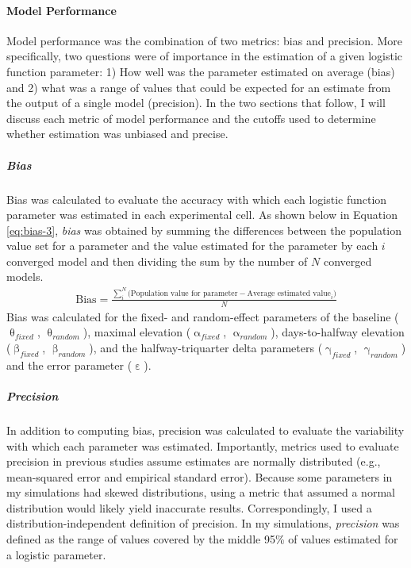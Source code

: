 \documentclass[
12pt, %
twoside,
english]{guelphthesis}
\begin{document}
\hypertarget{model-performance-2}{%
\paragraph{Model Performance}\label{model-performance-2}}

Model performance was the combination of two metrics: bias and precision. More specifically, two questions were of importance in the estimation of a given logistic function parameter: 1) How well was the parameter estimated on average (bias) and 2) what was a range of values that could be expected for an estimate from the output of a single model (precision). In the two sections that follow, I will discuss each metric of model performance and the cutoffs used to determine whether estimation was unbiased and precise.

\hypertarget{bias-1}{%
\subparagraph{Bias}\label{bias-1}}

Bias was calculated to evaluate the accuracy with which each logistic
function parameter was estimated in each experimental cell. As shown below in Equation
\eqref{eq:bias-3}, \emph{bias} was obtained by summing the differences
between the population value set for a parameter and the value estimated for the parameter by each \(i\) converged model and then dividing the sum by the number of \(N\) converged models.
\begin{align}
  \text{Bias} = \frac{\sum_i^N\text{(Population value for parameter} - \text{Average estimated value}_i)}{N}
  \label{eq:bias-3} 
\end{align}
\noindent Bias was calculated for the fixed- and random-effect parameters of the baseline (\(\uptheta_{fixed}\), \(\uptheta_{random}\)), maximal elevation (\(\upalpha_{fixed}\), \(\upalpha_{random}\)), days-to-halfway elevation (\(\upbeta_{fixed}\), \(\upbeta_{random}\)), and the halfway-triquarter delta parameters (\(\upgamma_{fixed}\), \(\upgamma_{random}\)) and the error parameter (\(\upepsilon\)).

\hypertarget{precision-1}{%
\subparagraph{Precision}\label{precision-1}}

In addition to computing bias, precision was calculated to evaluate the variability with which each parameter was estimated. Importantly, metrics used to evaluate precision in previous studies assume estimates are normally distributed (e.g., mean-squared error and empirical standard error). Because some parameters in my simulations had skewed distributions, using a metric that assumed a normal distribution would likely yield inaccurate results. Correspondingly, I used a distribution-independent definition of precision. In my simulations, \emph{precision} was defined as the range of values covered by the middle 95\% of values estimated for a logistic parameter.
\end{document}
